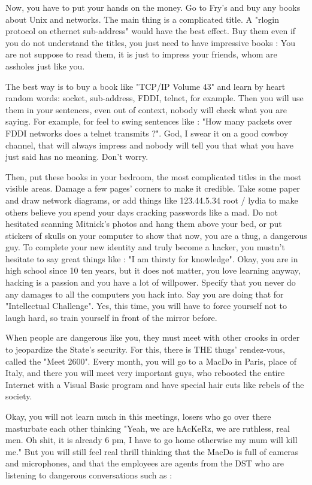 Now, you have to put your hands on the money. Go to Fry's and buy any books about Unix and networks. The main thing is a complicated title. A "rlogin protocol on ethernet sub-address" would have the best effect. Buy them even if you do not understand the titles, you just need to have impressive books : You are not suppose to read them, it is just to impress your friends, whom are assholes just like you.

The best way is to buy a book like "TCP/IP Volume 43" and learn by heart random words: socket, sub-address, FDDI, telnet, for example. Then you will use them in your sentences, even out of context, nobody will check what you are saying. For example, for feel to swing sentences like : "How many packets over FDDI networks does a telnet transmits ?". God, I swear it on a good cowboy channel, that will always impress and nobody will tell you that what you have just said has no meaning. Don't worry.

Then, put these books in your bedroom, the most complicated titles in the most visible areas. Damage a few pages' corners to make it credible. Take some paper and draw network diagrams, or add things like 123.44.5.34 root / lydia to make others believe you spend your days cracking passwords like a mad. Do not hesitated scanning Mitnick's photos and hang them above your bed, or put stickers of skulls on your computer to show that now, you are a thug, a dangerous guy.
To complete your new identity and truly become a hacker, you mustn't hesitate to say great things like : "I am thirsty for knowledge". Okay, you are in high school since 10 ten years, but it does not matter, you love learning anyway, hacking is a passion and you have a lot of willpower. Specify that you never do any damages to all the computers you hack into. Say you are doing that for "Intellectual Challenge". Yes, this time, you will have to force yourself not to laugh hard, so train yourself in front of the mirror before.

When people are dangerous like you, they must meet with other crooks in order to jeopardize the State's security. For this, there is THE thugs' rendez-vous, called the "Meet 2600". Every month, you will go to a MacDo in Paris, place of Italy, and there you will meet very important guys, who rebooted the entire Internet with a Visual Basic program and have special hair cuts like rebels of the society.

Okay, you will not learn much in this meetings, losers who go over there masturbate each other thinking "Yeah, we are hAcKeRz, we are ruthless, real men. Oh shit, it is already 6 pm, I have to go home otherwise my mum will kill me." But you will still feel real thrill thinking that the MacDo is full of cameras and microphones, and that the employees are agents from the DST who are listening to dangerous conversations such as :

